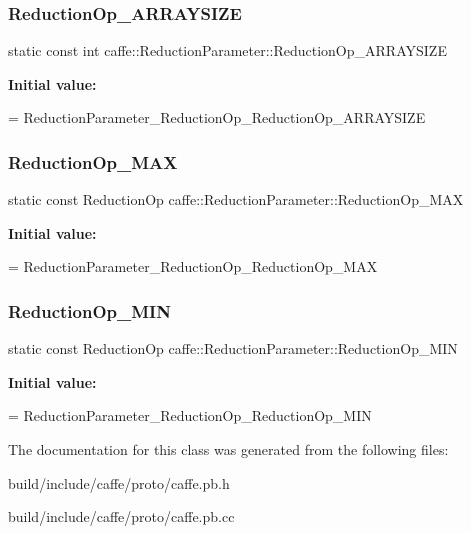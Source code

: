 \subsubsection{\texorpdfstring{Reduction\+Op\+\_\+\+A\+R\+R\+A\+Y\+S\+I\+ZE}{ReductionOp\_ARRAYSIZE}}
{\footnotesize\ttfamily static const int caffe\+::\+Reduction\+Parameter\+::\+Reduction\+Op\+\_\+\+A\+R\+R\+A\+Y\+S\+I\+ZE\hspace{0.3cm}{\ttfamily [static]}}

{\bfseries Initial value\+:}
\begin{DoxyCode}
=
    ReductionParameter\_ReductionOp\_ReductionOp\_ARRAYSIZE
\end{DoxyCode}
\mbox{\label{classcaffe_1_1_reduction_parameter_aef98e3647512caba1e4f1215d63bd40f}} 
\subsubsection{\texorpdfstring{Reduction\+Op\+\_\+\+M\+AX}{ReductionOp\_MAX}}
{\footnotesize\ttfamily static const Reduction\+Op caffe\+::\+Reduction\+Parameter\+::\+Reduction\+Op\+\_\+\+M\+AX\hspace{0.3cm}{\ttfamily [static]}}

{\bfseries Initial value\+:}
\begin{DoxyCode}
=
    ReductionParameter\_ReductionOp\_ReductionOp\_MAX
\end{DoxyCode}
\mbox{\label{classcaffe_1_1_reduction_parameter_a4da0a94808929c0e185876ca6a3f54d8}} 
\subsubsection{\texorpdfstring{Reduction\+Op\+\_\+\+M\+IN}{ReductionOp\_MIN}}
{\footnotesize\ttfamily static const Reduction\+Op caffe\+::\+Reduction\+Parameter\+::\+Reduction\+Op\+\_\+\+M\+IN\hspace{0.3cm}{\ttfamily [static]}}

{\bfseries Initial value\+:}
\begin{DoxyCode}
=
    ReductionParameter\_ReductionOp\_ReductionOp\_MIN
\end{DoxyCode}


The documentation for this class was generated from the following files\+:\begin{DoxyCompactItemize}
\item 
build/include/caffe/proto/caffe.\+pb.\+h\item 
build/include/caffe/proto/caffe.\+pb.\+cc\end{DoxyCompactItemize}

